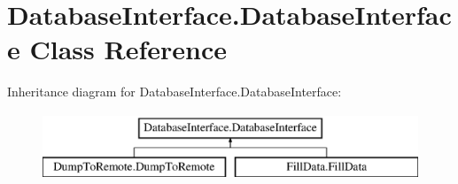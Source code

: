 \hypertarget{class_database_interface_1_1_database_interface}{\section{Database\-Interface.\-Database\-Interface Class Reference}
\label{class_database_interface_1_1_database_interface}
}
Inheritance diagram for Database\-Interface.\-Database\-Interface\-:\begin{figure}[H]
\begin{center}
\leavevmode
\includegraphics[height=2.000000cm]{class_database_interface_1_1_database_interface}
\end{center}
\end{figure}
